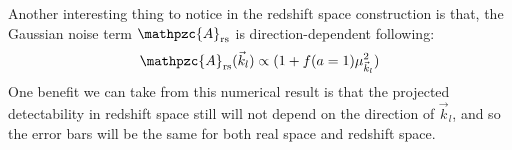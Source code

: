 \documentclass[prd,amsmath,amssymb,floatfix,superscriptaddress,nofootinbib,twocolumn]{revtex4-1}
\def\be{\begin{equation}}
\def\ee{\end{equation}}
\newcommand{\rs}{\rm rs}
\newcommand{\vk}{\vec{k}}
\begin{document}
Another interesting thing to notice in the redshift space construction is that, the Gaussian noise term $\mathpzc{A}_{\rs}$ is direction-dependent following:
\be 
\mathpzc{A}_{\rs}(\vk_l)\propto(1+f(a=1)\mu_{\vk_l}^{2})
\ee 
One benefit we can take from this numerical result is that the projected detectability in redshift space still will not depend on the direction of $\vk_l$, and so the error bars will be the same for both real space and redshift space.




\end{document}
